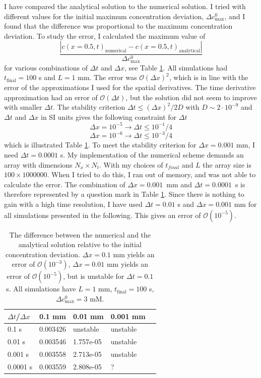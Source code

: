 \documentclass{uiophd}
\begin{document}
I have compared the analytical solution to the numerical solution. I tried with different values for the initial maximum concentration deviation, $\Delta c^0_{\text{max}}$, and I found that the difference was proportional to the maximum concentration deviation. To study the error, I calculated the maximum value of
\begin{equation}
\frac{|c(x=0.5,t)_{\text{numerical}}-c(x=0.5,t)_{\text{analytical}}|}{\Delta c^0_{\text{max}}}
\end{equation}
for various combinations of $\Delta t$ and $\Delta x$, see Table \ref{tab:error}. All simulations had $t_{\text{final}} = 100$ s and $L=1$ mm. The error was $\mathcal{O}(\Delta x)^2$, which is in line with the error of the  approximations I used for the spatial derivatives. The time derivative approximation had an error of $\mathcal{O}(\Delta t)$, but the solution did not seem to improve with smaller $\Delta t$. The stability criterion $\Delta t \leq (\Delta x)^2/2D$ with $D \sim 2\cdot 10^{-9}$ and $\Delta t $ and $\Delta x$ in SI units gives the following constraint for $\Delta t$
$$\Delta x= 10^{-5} \rightarrow \Delta t \leq 10^{-1}/4$$
$$\Delta x= 10^{-6} \rightarrow \Delta t \leq 10^{-3}/4$$ 
which is illustrated Table \ref{tab:error}. To meet the stability criterion for $\Delta x = 0.001$ mm, I need $\Delta t = 0.0001$ s. My implementation of the numerical scheme  demands an array with dimensions $N_x \times N_t$. With my choices of $t_{final}$ and $L$ the array size is  $100\times 1000 000$. When I tried to do this, I ran out of memory, and was not able to calculate the error. The combination of $\Delta x = 0.001$~mm and $\Delta t = 0.0001$~s is therefore represented by a question mark in Table \ref{tab:error}.
Since there is nothing to gain with a high time resolution, I have used $\Delta t = 0.01$ s and $\Delta x = 0.001$ mm for all simulations presented in the following. This gives an error of $\mathcal{O}(10^{-5})$. 
\begin{table}[h!]
  \centering
  \caption{The difference between the numerical and the analytical solution relative to the initial concentration deviation. $\Delta x =0.1$ mm yields an error of $\mathcal{O}(10^{-3})$, $\Delta x =0.01$ mm yields an error of $\mathcal{O}(10^{-5})$, but is unstable for $\Delta t = 0.1$ s. All simulations have $L=1$ mm, $t_ {\text{final}} =100$ s, $\Delta c^0_{\text{max}} =3$ mM.}
  \label{tab:error}
  \begin{tabular}{l||l|l|l|l}
$\Delta t$/$\Delta x$ & 0.1 mm & 0.01 mm & 0.001 mm  \\
\hline
0.1 s & 0.003426 &  unstable & unstable \\
0.01 s & 0.003546 & 1.757e-05  & unstable \\
0.001 s & 0.003558 & 2.713e-05 & unstable \\
0.0001 s & 0.003559& 2.808e-05 & ? \\

 \end{tabular}
\end{table}
\end{document}
